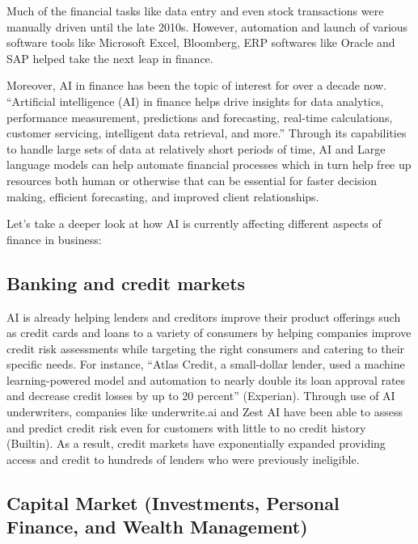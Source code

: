 \documentclass[
]{article}
\begin{document}
Much of the financial tasks like data entry and even stock transactions were manually driven until the late 2010s. However, automation and launch of various software tools like Microsoft Excel, Bloomberg, ERP softwares like Oracle and SAP helped take the next leap in finance.

Moreover, AI in finance has been the topic of interest for over a decade now. ``Artificial intelligence (AI) in finance helps drive insights for data analytics, performance measurement, predictions and forecasting, real-time calculations, customer servicing, intelligent data retrieval, and more.'' Through its capabilities to handle large sets of data at relatively short periods of time, AI and Large language models can help automate financial processes which in turn help free up resources both human or otherwise that can be essential for faster decision making, efficient forecasting, and improved client relationships.

Let's take a deeper look at how AI is currently affecting different aspects of finance in business:

\hypertarget{banking-and-credit-markets}{%
\subsection{Banking and credit markets}\label{banking-and-credit-markets}}

AI is already helping lenders and creditors improve their product offerings such as credit cards and loans to a variety of consumers by helping companies improve credit risk assessments while targeting the right consumers and catering to their specific needs. For instance, ``Atlas Credit, a small-dollar lender, used a machine learning-powered model and automation to nearly double its loan approval rates and decrease credit losses by up to 20 percent'' (Experian). Through use of AI underwriters, companies like underwrite.ai and Zest AI have been able to assess and predict credit risk even for customers with little to no credit history (Builtin). As a result, credit markets have exponentially expanded providing access and credit to hundreds of lenders who were previously ineligible.

\hypertarget{capital-market-investments-personal-finance-and-wealth-management}{%
\subsection{Capital Market (Investments, Personal Finance, and Wealth Management)}\label{capital-market-investments-personal-finance-and-wealth-management}}
\end{document}
